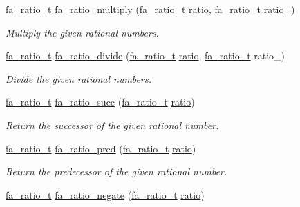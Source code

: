 \begin{DoxyCompactItemize}
\hyperlink{group___fa_ratio_gaf3b37b5fdfcccb6283b7ac806c72b273}{fa\-\_\-ratio\-\_\-t} \hyperlink{group___fa_ratio_gaeeef9bb9a4a888e53e7fbe09ff5c5dd0}{fa\-\_\-ratio\-\_\-multiply} (\hyperlink{group___fa_ratio_gaf3b37b5fdfcccb6283b7ac806c72b273}{fa\-\_\-ratio\-\_\-t} \hyperlink{util_8h_a866d3cbbee2679ec3c34f27a256445de}{ratio}, \hyperlink{group___fa_ratio_gaf3b37b5fdfcccb6283b7ac806c72b273}{fa\-\_\-ratio\-\_\-t} ratio\-\_\-)
\begin{DoxyCompactList}\small\item\em Multiply the given rational numbers. \end{DoxyCompactList}\item 
\hyperlink{group___fa_ratio_gaf3b37b5fdfcccb6283b7ac806c72b273}{fa\-\_\-ratio\-\_\-t} \hyperlink{group___fa_ratio_ga5995de6035f8f7f95c645dfd6d1b3297}{fa\-\_\-ratio\-\_\-divide} (\hyperlink{group___fa_ratio_gaf3b37b5fdfcccb6283b7ac806c72b273}{fa\-\_\-ratio\-\_\-t} \hyperlink{util_8h_a866d3cbbee2679ec3c34f27a256445de}{ratio}, \hyperlink{group___fa_ratio_gaf3b37b5fdfcccb6283b7ac806c72b273}{fa\-\_\-ratio\-\_\-t} ratio\-\_\-)
\begin{DoxyCompactList}\small\item\em Divide the given rational numbers. \end{DoxyCompactList}\item 
\hyperlink{group___fa_ratio_gaf3b37b5fdfcccb6283b7ac806c72b273}{fa\-\_\-ratio\-\_\-t} \hyperlink{group___fa_ratio_ga7c72bad7eef5ca15eb888b08ed744ed0}{fa\-\_\-ratio\-\_\-succ} (\hyperlink{group___fa_ratio_gaf3b37b5fdfcccb6283b7ac806c72b273}{fa\-\_\-ratio\-\_\-t} \hyperlink{util_8h_a866d3cbbee2679ec3c34f27a256445de}{ratio})
\begin{DoxyCompactList}\small\item\em Return the successor of the given rational number. \end{DoxyCompactList}\item 
\hyperlink{group___fa_ratio_gaf3b37b5fdfcccb6283b7ac806c72b273}{fa\-\_\-ratio\-\_\-t} \hyperlink{group___fa_ratio_ga78052a323d41d5d76a526e1e19ba0eb2}{fa\-\_\-ratio\-\_\-pred} (\hyperlink{group___fa_ratio_gaf3b37b5fdfcccb6283b7ac806c72b273}{fa\-\_\-ratio\-\_\-t} \hyperlink{util_8h_a866d3cbbee2679ec3c34f27a256445de}{ratio})
\begin{DoxyCompactList}\small\item\em Return the predecessor of the given rational number. \end{DoxyCompactList}\item 
\hyperlink{group___fa_ratio_gaf3b37b5fdfcccb6283b7ac806c72b273}{fa\-\_\-ratio\-\_\-t} \hyperlink{group___fa_ratio_ga39bc43bc50d936309bf763b6903249bd}{fa\-\_\-ratio\-\_\-negate} (\hyperlink{group___fa_ratio_gaf3b37b5fdfcccb6283b7ac806c72b273}{fa\-\_\-ratio\-\_\-t} \hyperlink{util_8h_a866d3cbbee2679ec3c34f27a256445de}{ratio})

\end{DoxyCompactItemize}

